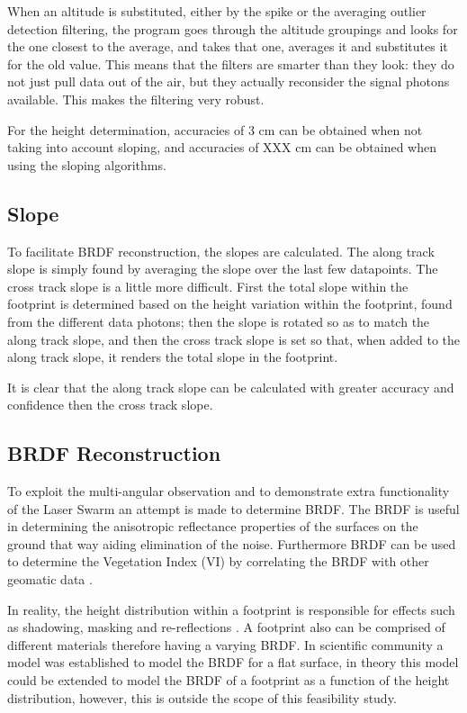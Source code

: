 When an altitude is substituted, either by the spike or the averaging outlier detection filtering, the program goes through the altitude groupings and looks for the one closest to the average, and takes that one, averages it and substitutes it for the old value. This means that the filters are smarter than they look: they do not just pull data out of the air, but they actually reconsider the signal photons available. This makes the filtering very robust.

For the height determination, accuracies of 3 cm can be obtained when not taking into account sloping, and accuracies of XXX cm can be obtained when using the sloping algorithms. 

\subsection{Slope}
\label{sec:Slope}
To facilitate BRDF reconstruction, the slopes are calculated. The along track slope is simply found by averaging the slope over the last few datapoints. The cross track slope is a little more difficult. First the total slope within the footprint is determined based on the height variation within the footprint, found from the different data photons; then the slope is rotated so as to match the along track slope, and then the cross track slope is set so that, when added to the along track slope, it renders the total slope in the footprint.

It is clear that the along track slope can be calculated with greater accuracy and confidence then the cross track slope.

\subsection{BRDF Reconstruction}
\label{sec:BRDFReconstuction}


To exploit the multi-angular observation and to demonstrate extra functionality of the Laser Swarm an attempt is made to determine BRDF. 
The BRDF is useful in determining the anisotropic reflectance properties of the surfaces on the ground that way aiding elimination of the noise. Furthermore BRDF can be used to determine the Vegetation Index (VI) by correlating the BRDF with other geomatic data \cite{BRDFwanner}. 



In reality, the height distribution within a footprint is responsible for effects such as shadowing, masking and re-reflections \cite{BRDFsparrow}. A footprint also can be comprised of different materials therefore having a varying BRDF. In scientific community a model was established to model the BRDF for a flat surface, in theory this model could be extended to model the BRDF of a footprint as a function of the height distribution, however, this is outside the scope of this feasibility study. 


